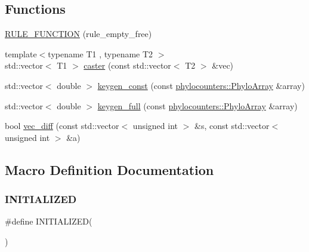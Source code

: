 \subsection*{Functions}
\begin{DoxyCompactItemize}
\item 
\hyperlink{aphylomodel-bones_8hpp_a11c7dd7dca27f32547bb602f30ceb5e8}{R\+U\+L\+E\+\_\+\+F\+U\+N\+C\+T\+I\+ON} (rule\+\_\+empty\+\_\+free)
\item 
{\footnotesize template$<$typename T1 , typename T2 $>$ }\\std\+::vector$<$ T1 $>$ \hyperlink{aphylomodel-bones_8hpp_a1f293b9028bf34b1aa8506c8f0af4413}{caster} (const std\+::vector$<$ T2 $>$ \&vec)
\item 
std\+::vector$<$ double $>$ \hyperlink{aphylomodel-bones_8hpp_a513c16e4b1a39f810501041e7b8fa448}{keygen\+\_\+const} (const \hyperlink{namespacebarry_1_1counters_1_1phylo_abd293bf65e494e903639fb5fb2c91604}{phylocounters\+::\+Phylo\+Array} \&array)
\item 
std\+::vector$<$ double $>$ \hyperlink{aphylomodel-bones_8hpp_aa60134cca317d64e4b3d1707380d5d0d}{keygen\+\_\+full} (const \hyperlink{namespacebarry_1_1counters_1_1phylo_abd293bf65e494e903639fb5fb2c91604}{phylocounters\+::\+Phylo\+Array} \&array)
\item 
bool \hyperlink{aphylomodel-bones_8hpp_ac4e3e3e3920b3bbde57ac1ed395e9983}{vec\+\_\+diff} (const std\+::vector$<$ unsigned int $>$ \&s, const std\+::vector$<$ unsigned int $>$ \&a)
\end{DoxyCompactItemize}


\subsection{Macro Definition Documentation}
\mbox{\label{aphylomodel-bones_8hpp_a08888c91f4cab1da64c8f8bf10b59c40}} 
\subsubsection{\texorpdfstring{I\+N\+I\+T\+I\+A\+L\+I\+Z\+ED}{INITIALIZED}}
{\footnotesize\ttfamily \#define I\+N\+I\+T\+I\+A\+L\+I\+Z\+ED(\begin{DoxyParamCaption}{ }\end{DoxyParamCaption})}

